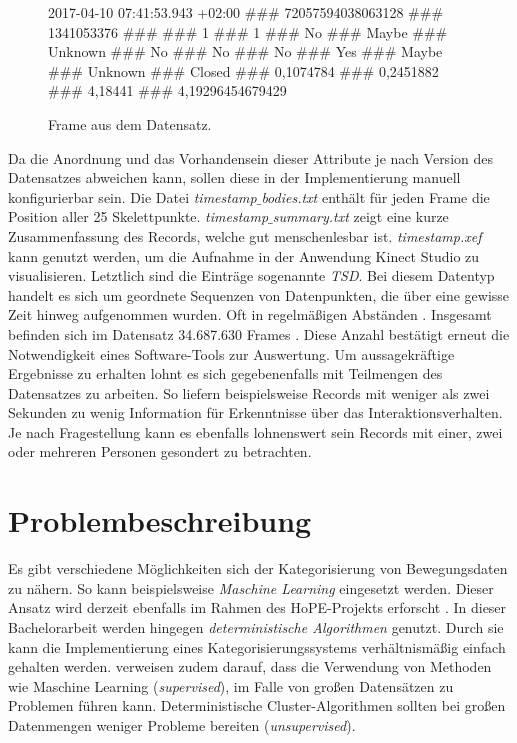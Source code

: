 \begin{figure}[ht]
  \begin{center}
    2017-04-10 07:41:53.943 +02:00 \#\#\# 72057594038063128 \#\#\# 1341053376 \#\#\# 
    \newline \#\#\# 1 \#\#\# 1 \#\#\# No \#\#\# Maybe \#\#\# Unknown \#\#\# No \#\#\# No \#\#\#
    \newline No \#\#\# Yes \#\#\# Maybe \#\#\# Unknown \#\#\# Closed \#\#\# 0,1074784
    \newline \#\#\# 0,2451882 \#\#\# 4,18441 \#\#\# 4,19296454679429
  \end{center}
  \caption{Frame aus dem Datensatz.}
  \label{fig:FrameExample}
\end{figure}

Da die Anordnung und das Vorhandensein dieser Attribute je nach Version des Datensatzes abweichen kann,
sollen diese in der Implementierung manuell konfigurierbar sein.
Die Datei \emph{timestamp$\_$bodies.txt} enthält für jeden Frame die Position aller 25 Skelettpunkte.
\emph{timestamp$\_$summary.txt} zeigt eine kurze Zusammenfassung des Records, welche gut menschenlesbar ist.
\emph{timestamp.xef} kann genutzt werden, um die Aufnahme in der Anwendung Kinect Studio zu visualisieren.
Letztlich sind die Einträge sogenannte \emph{\ac{TSD}}.
Bei diesem Datentyp handelt es sich um geordnete Sequenzen von Datenpunkten,
die über eine gewisse Zeit hinweg aufgenommen wurden.
Oft in regelmäßigen Abständen \citep{ali_clustering_2019}.
Insgesamt befinden sich im Datensatz 34.687.630 Frames \citep{temiz_konzeption_2022}.
Diese Anzahl bestätigt erneut die Notwendigkeit eines Software-Tools zur Auswertung.
Um aussagekräftige Ergebnisse zu erhalten lohnt es sich gegebenenfalls mit Teilmengen des Datensatzes zu arbeiten.
So liefern beispielsweise Records mit weniger als zwei Sekunden zu wenig Information
für Erkenntnisse über das Interaktionsverhalten.
Je nach Fragestellung kann es ebenfalls lohnenswert sein Records mit einer, zwei oder mehreren Personen
gesondert zu betrachten.

\section{Problembeschreibung}
\label{2-Problembeschreibung}
Es gibt verschiedene Möglichkeiten sich der Kategorisierung von Bewegungsdaten zu nähern.
So kann beispielsweise \emph{Maschine Learning} eingesetzt werden.
Dieser Ansatz wird derzeit ebenfalls im Rahmen des HoPE-Projekts erforscht \citep{plischke_master_2022}.
In dieser Bachelorarbeit werden hingegen \emph{deterministische Algorithmen} genutzt.
Durch sie kann die Implementierung eines Kategorisierungssystems verhältnismäßig einfach gehalten werden.
\citet{aghabozorgi_time-series_2015} verweisen zudem darauf, dass die Verwendung von Methoden
wie Maschine Learning (\emph{supervised}), im Falle von großen Datensätzen zu Problemen führen kann.
Deterministische Cluster-Algorithmen sollten bei großen Datenmengen weniger Probleme bereiten (\emph{unsupervised}).

